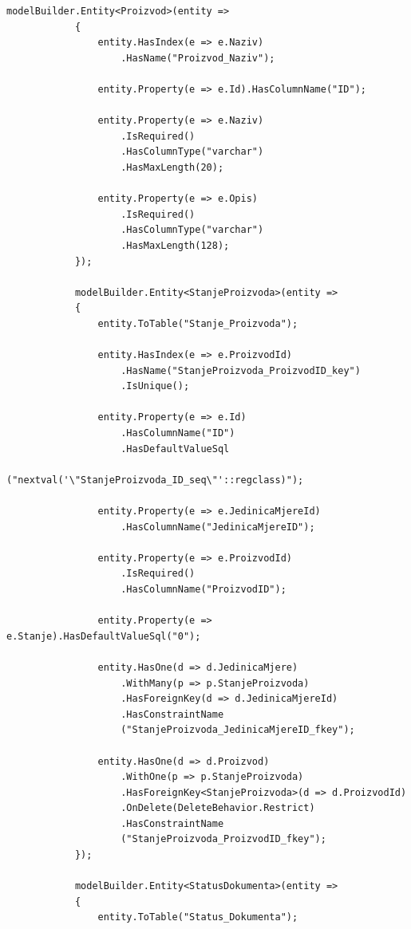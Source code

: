 \documentclass[a4paper,12pt]{foi}
\begin{document}
\begin{lstlisting}[language={[Sharp]C}]
            modelBuilder.Entity<Proizvod>(entity =>
            {
                entity.HasIndex(e => e.Naziv)
                    .HasName("Proizvod_Naziv");

                entity.Property(e => e.Id).HasColumnName("ID");

                entity.Property(e => e.Naziv)
                    .IsRequired()
                    .HasColumnType("varchar")
                    .HasMaxLength(20);

                entity.Property(e => e.Opis)
                    .IsRequired()
                    .HasColumnType("varchar")
                    .HasMaxLength(128);
            });

            modelBuilder.Entity<StanjeProizvoda>(entity =>
            {
                entity.ToTable("Stanje_Proizvoda");

                entity.HasIndex(e => e.ProizvodId)
                    .HasName("StanjeProizvoda_ProizvodID_key")
                    .IsUnique();

                entity.Property(e => e.Id)
                    .HasColumnName("ID")
                    .HasDefaultValueSql
                    ("nextval('\"StanjeProizvoda_ID_seq\"'::regclass)");

                entity.Property(e => e.JedinicaMjereId)
                	.HasColumnName("JedinicaMjereID");

                entity.Property(e => e.ProizvodId)
                    .IsRequired()
                    .HasColumnName("ProizvodID");

                entity.Property(e => e.Stanje).HasDefaultValueSql("0");

                entity.HasOne(d => d.JedinicaMjere)
                    .WithMany(p => p.StanjeProizvoda)
                    .HasForeignKey(d => d.JedinicaMjereId)
                    .HasConstraintName
                    ("StanjeProizvoda_JedinicaMjereID_fkey");

                entity.HasOne(d => d.Proizvod)
                    .WithOne(p => p.StanjeProizvoda)
                    .HasForeignKey<StanjeProizvoda>(d => d.ProizvodId)
                    .OnDelete(DeleteBehavior.Restrict)
                    .HasConstraintName
                    ("StanjeProizvoda_ProizvodID_fkey");
            });

            modelBuilder.Entity<StatusDokumenta>(entity =>
            {
                entity.ToTable("Status_Dokumenta");


\end{lstlisting}
\end{document}
